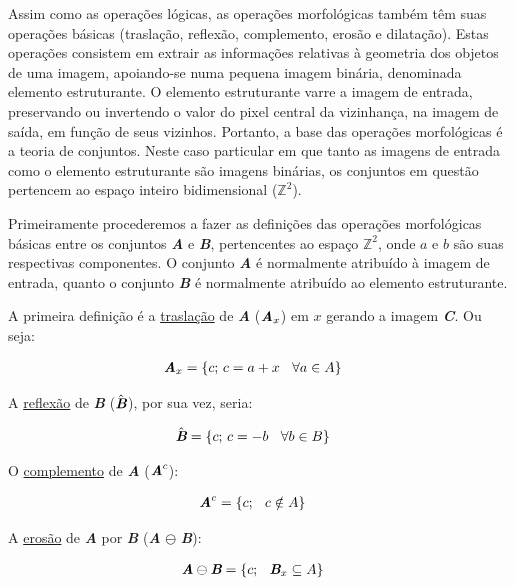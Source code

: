 Assim como as operações lógicas, as operações morfológicas também têm
suas operações básicas (traslação, reflexão, complemento, erosão e
dilatação). Estas operações consistem em extrair as informações
relativas à geometria dos objetos de uma imagem, apoiando-se numa
pequena imagem binária, denominada elemento estruturante. O elemento
estruturante varre a imagem de entrada, preservando ou invertendo o
valor do pixel central da vizinhança, na imagem de saída, em função de
seus vizinhos.\cite{72} Portanto, a base das operações morfológicas é
a teoria de conjuntos. Neste caso particular em que tanto as imagens
de entrada como o elemento estruturante são imagens binárias, os
conjuntos em questão pertencem ao espaço inteiro bidimensional
($\mathbb{Z}^{2}$).

Primeiramente procederemos a fazer as definições das operações
morfológicas básicas entre os conjuntos \textit{\textbf{A}} e
\textit{\textbf{B}}, pertencentes ao espaço $\mathbb{Z}^{2}$, onde $a$
e $b$ são suas respectivas componentes. O conjunto \textit{\textbf{A}}
é normalmente atribuído à imagem de entrada, quanto o conjunto
\textit{\textbf{B}} é normalmente atribuído ao elemento estruturante.

A primeira definição é a \underline{traslação} de \textit{\textbf{A}}
($\textit{\textbf{A}}_{x}$) em $x$ gerando a imagem
\textit{\textbf{C}}.\cite{88} Ou seja:

\begin{align}
 &\textit{\textbf{A}}_{x} = \left\lbrace \text{$c$; $c = a + x$ \: $\forall a \in A$} \right\rbrace
\end{align}

A \underline{reflexão} de \textit{\textbf{B}}
($\hat{\textit{\textbf{B}}}$), por sua vez, seria:

\begin{align}
 &\hat{\textit{\textbf{B}}} = \left\lbrace \text{$c$; $c = -b$ \: $\forall b \in B$} \right\rbrace
\end{align}

O \underline{complemento} de \textit{\textbf{A}}
($\textit{\textbf{A}}^{c}$):

\begin{align}
 &\textit{\textbf{A}}^{c} = \left\lbrace \text{$c$; \: $c \notin A$} \right\rbrace
\end{align}

A \underline{erosão} de \textit{\textbf{A}} por \textit{\textbf{B}}
(\textit{\textbf{A}} $\ominus$ \textit{\textbf{B}}):

\begin{align}
  &\textit{\textbf{A}} \ominus \textit{\textbf{B}} = \left\lbrace
    \text{$c$; \: $\textit{\textbf{B}}_{x} \subseteq A$}
  \right\rbrace\label{eq-erode}
\end{align}

